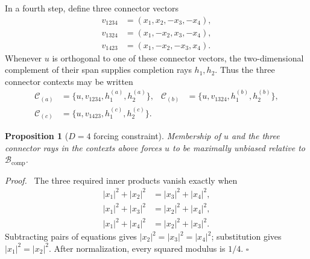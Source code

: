 \documentclass[%
  reprint,
  superscriptaddress,
  showpacs,
  showkeys,
  amsmath,amssymb,
  pra,
  longbibliography,
  floatfix,
  x11names
]{revtex4-2}
\newenvironment{revision}{\begingroup\color{revisionblue}}{\endgroup}
\newtheorem{proposition}{Proposition}
\newenvironment{proof}{\par\noindent\textit{Proof.}\ }{\hfill$\square$\par}
\begin{document}
In a fourth step, define three connector vectors
\begin{align*}
v_{1234}&=(x_1,x_2,-x_3,-x_4),\\
v_{1324}&=(x_1,-x_2,x_3,-x_4),\\
v_{1423}&=(x_1,-x_2,-x_3,x_4).
\end{align*}
\begin{revision}
Whenever $u$ is orthogonal to one of these connector vectors, the two-dimensional complement of their span supplies completion rays $h_1,h_2$.  Thus the three connector contexts may be written
\begin{align*}
\mathcal{C}_{(a)}&=\{u,v_{1234},h^{(a)}_1,h^{(a)}_2\},&
\mathcal{C}_{(b)}&=\{u,v_{1324},h^{(b)}_1,h^{(b)}_2\},\\
\mathcal{C}_{(c)}&=\{u,v_{1423},h^{(c)}_1,h^{(c)}_2\}.
\end{align*}

\begin{proposition}[$D=4$ forcing constraint]
\label{prop:D4forcing}
Membership of $u$ and the three connector rays in the contexts above forces $u$ to be maximally unbiased relative to $\mathcal{B}_{\mathrm{comp}}$.
\end{proposition}

\begin{proof}
The three required inner products vanish exactly when
\begin{align}
|x_1|^2+|x_2|^2&=|x_3|^2+|x_4|^2, \label{eq:D4a}\\
|x_1|^2+|x_3|^2&=|x_2|^2+|x_4|^2, \label{eq:D4b}\\
|x_1|^2+|x_4|^2&=|x_2|^2+|x_3|^2. \label{eq:D4c}
\end{align}
Subtracting pairs of equations gives $|x_2|^2=|x_3|^2=|x_4|^2$; substitution gives $|x_1|^2=|x_2|^2$.  After normalization, every squared modulus is $1/4$.
\end{proof}


\end{revision}
\end{document}
